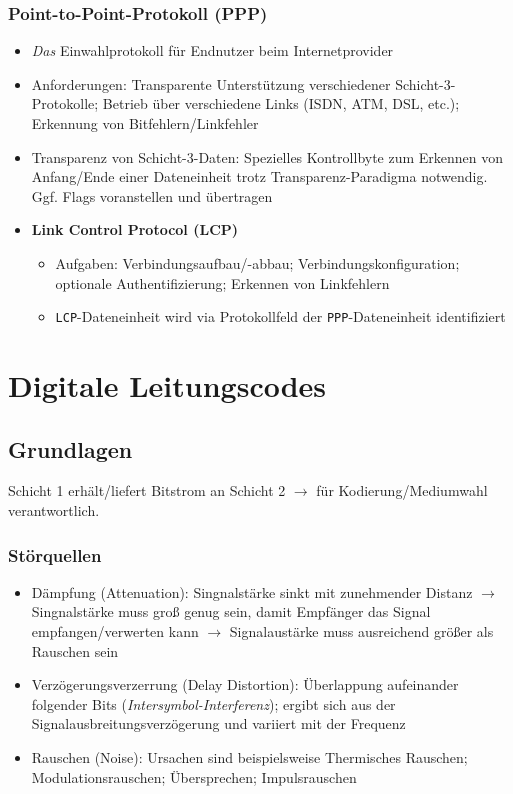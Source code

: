 \subsubsection{Point-to-Point-Protokoll (PPP)}
\begin{itemize}
	\item \textit{Das} Einwahlprotokoll für Endnutzer beim Internetprovider
	\item Anforderungen: Transparente Unterstützung verschiedener Schicht-3-Protokolle; Betrieb über verschiedene Links (ISDN, ATM, DSL, etc.); Erkennung von Bitfehlern/Linkfehler
	\item Transparenz von Schicht-3-Daten: Spezielles Kontrollbyte zum Erkennen von Anfang/Ende einer Dateneinheit trotz Transparenz-Paradigma notwendig. Ggf. Flags voranstellen und übertragen
	\item \textbf{Link Control Protocol (LCP)}
	\begin{itemize}
		\item Aufgaben: Verbindungsaufbau/-abbau; Verbindungskonfiguration; optionale Authentifizierung; Erkennen von Linkfehlern
		\item \texttt{LCP}-Dateneinheit wird via Protokollfeld der \texttt{PPP}-Dateneinheit identifiziert
	\end{itemize}
\end{itemize}



\section{Digitale Leitungscodes}

\subsection{Grundlagen}
Schicht 1 erhält/liefert Bitstrom an Schicht 2 \(\rightarrow\) für Kodierung/Mediumwahl verantwortlich.

\subsubsection{Störquellen}
\begin{itemize}
	\item Dämpfung (Attenuation): Singnalstärke sinkt mit zunehmender Distanz \(\rightarrow\) Singnalstärke muss groß genug sein, damit Empfänger das Signal empfangen/verwerten kann \(\rightarrow\) Signalaustärke muss ausreichend größer als Rauschen sein
	\item Verzögerungsverzerrung (Delay Distortion): Überlappung aufeinander folgender Bits (\textit{Intersymbol-Interferenz}); ergibt sich aus der Signalausbreitungsverzögerung und variiert mit der Frequenz
	\item Rauschen (Noise): Ursachen sind beispielsweise Thermisches Rauschen; Modulationsrauschen; Übersprechen; Impulsrauschen
\end{itemize}

